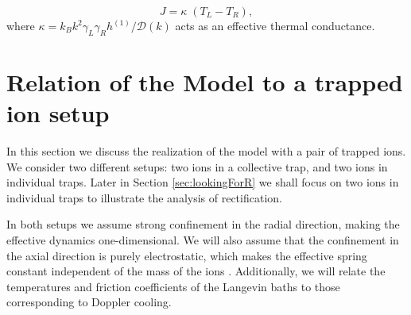 %
\begin{equation}
  J = \kappa\;(T_L - T_R),
  \label{eq:CurrentsInModelB}
\end{equation}
%
where $\kappa = k_B {k^2\gamma_L \gamma_R h^{(1)}}/{\mathcal{D}(k)}$ acts as an effective thermal conductance.
%
%
%
%
\section{Relation of the Model to a trapped ion setup \label{sec:TrappedIonSetUp}}
%
%
%
%
In this section we discuss the realization of the model with  a pair of trapped ions. We consider two different setups: two ions in a collective trap, and two ions in individual traps. Later in Section \ref{sec:lookingForR} we shall focus on two ions in individual traps to illustrate the analysis of rectification.

In both setups we assume strong confinement in the radial direction, making the effective dynamics one-dimensional. We will also assume that the confinement in the axial direction is purely electrostatic, which makes the effective spring constant independent of the mass of the ions \cite{Leibfried2003}. Additionally, we will relate the temperatures and friction coefficients of the Langevin baths to those corresponding to Doppler cooling.
%
%
